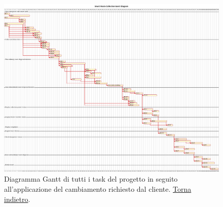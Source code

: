 \begin{figure}[H]
    \centering
    \includegraphics[width=\textwidth]{img/gantt-redefinition.pm}
    \caption{Diagramma Gantt di tutti i task del progetto in seguito all'applicazione del cambiamento richiesto dal cliente.  \hyperlink{back:gantt-redefinition}{Torna indietro}.}
    \label{fig:gantt-redefinition}
\end{figure}
